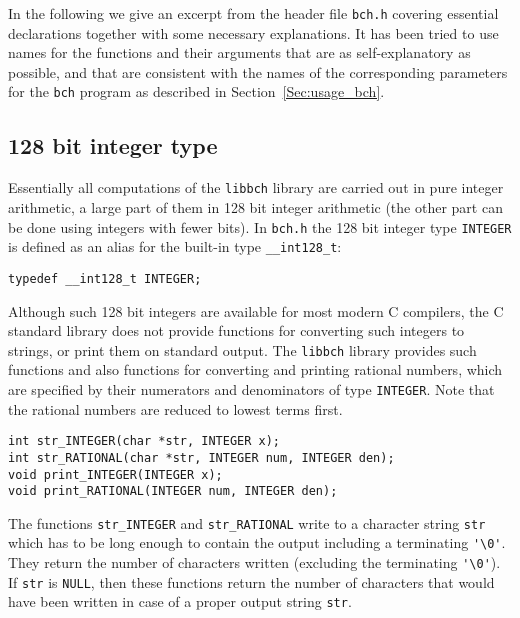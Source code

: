 \documentclass[11pt,a4paper]{article}
\begin{document}
In the following we give an 
excerpt from the header file \verb|bch.h|
covering  essential declarations together with some
necessary explanations. 
It has been tried to use names for the functions and their arguments
that are as self-explanatory as possible, and that are consistent with
the names of the corresponding parameters for the  \verb|bch| program
as described in Section~\ref{Sec:usage_bch}.

\subsection{128 bit integer type}
Essentially all computations of the \verb|libbch| library are carried out in pure integer arithmetic, a
large part of them in 128 bit integer arithmetic (the other part can be done
using integers with fewer bits). In \verb|bch.h| 
the 128 bit integer type  \verb|INTEGER| is defined
as an alias for the built-in type \verb|__int128_t|:
\begin{verbatim}
typedef __int128_t INTEGER; 
\end{verbatim}
Although such 128 bit integers are available for most modern
C compilers, the C %
standard library does not
provide functions for converting such integers to strings, or print them 
on standard output. The \verb|libbch| library provides such functions and also functions 
for converting and printing rational numbers, which are 
specified by their numerators and denominators of type \verb|INTEGER|.
Note that the rational numbers are reduced to lowest terms first.
\begin{verbatim}
int str_INTEGER(char *str, INTEGER x);
int str_RATIONAL(char *str, INTEGER num, INTEGER den);
void print_INTEGER(INTEGER x);
void print_RATIONAL(INTEGER num, INTEGER den);
\end{verbatim}
The functions \verb|str_INTEGER| and \verb|str_RATIONAL| write
to a character string \verb|str| which has to be long enough 
to contain the output including a terminating \verb|'\0'|.
They return the number of characters written (excluding the terminating \verb|'\0'|).
If \verb|str| is \verb|NULL|, then these functions return the number
of characters that would have been written in case of a proper output
string \verb|str|.
\end{document}
